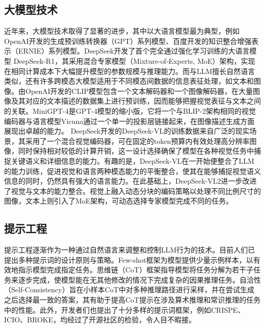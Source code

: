 \subsection{大模型技术}
近年来，大模型技术取得了显著的进步，其中以大语言模型最为典型，例如OpenAI开发的生成预训练转换器（GPT）系列模型、百度开发的知识整合增强表示（ERNIE）系列模型\cite{zhangERNIEEnhancedLanguage2019}。DeepSeek开发了首个完全通过强化学习训练的大语言模型 DeepSeek-R1\cite{deepseek-aiDeepSeekR1IncentivizingReasoning2025}，其采用混合专家模型（Mixture-of-Experts, MoE）架构，实现在相同计算成本下大幅提升模型的参数规模与推理能力。而与LLM擅长自然语言类似，还有许多跨模态大模型适用于不同模态间数据的信息表征处理，如文本和图像。由OpenAI开发的CLIP模型\cite{radfordLearningTransferableVisual2021}包含一个文本解码器和一个图像解码器，在大量图像及其对应的文本描述的数据集上进行预训练，因而能够把握视觉表征与文本之间的关联。MiniGPT-4\cite{zhuMiniGPT4EnhancingVisionLanguage2023}是GPT-4模型的缩小版，它将一个与BLIP-2架构相同的视觉编码器与语言模型Vicuna通过一个单一的投影层链接起来，在图像描述生成方面展现出卓越的能力。
DeepSeek开发的DeepSeek-VL\cite{luDeepSeekVLRealWorldVisionLanguage2024}的训练数据来自广泛的现实场景，其采用了一个混合视觉编码器，可在固定的token预算内有效处理高分辨率图像，同时保持相对较低的计算开销，这一设计选择确保了模型在各种视觉任务中捕捉关键语义和详细信息的能力。有趣的是，DeepSeek-VL在一开始便整合了LLM的能力训练，促进视觉和语言两种模态能力的平衡整合，使其在能够捕捉视觉语义信息的同时，仍然具有强大的语言能力。在此基础上，DeepSeek-VL2\cite{wuDeepSeekVL2MixtureofExpertsVisionLanguage2024}进一步改进了视觉与文本的能力整合。视觉上融入动态分块的编码策略以处理不同比例尺寸的图像，文本上则引入了MoE架构，可动态选择专家模型完成不同的任务。

\subsection{提示工程}
提示工程逐渐作为一种通过自然语言来调整和控制LLM行为的技术。目前人们已提出多种提示词的设计原则与策略。Few-shot框架\cite{brownLanguageModelsAre2020}为模型提供少量示例样本，以有效地指示模型完成指定任务。思维链（CoT）框架\cite{weiChainofThoughtPromptingElicits2022}指导模型将任务分解为若干子任务来逐步完成，使模型能在无其他修改的情况下完成复杂的因果推理任务。自洽性（Self-Consistency）\cite{wangSelfConsistencyImprovesChain2023a}旨在小样本CoT中对多种推理路径进行采样，并在尝试生成之后选择最一致的答案，其有助于提高CoT提示在涉及算术推理和常识推理的任务中的性能。此外，开发者们也提出了十分多样的提示词框架，例如CRISPE、ICIO、BROKE，均经过了开源社区的检验，令人目不暇接。

